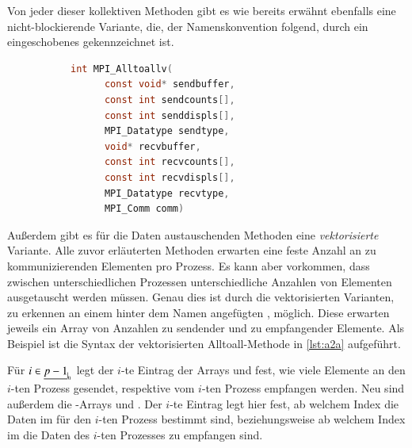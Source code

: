      Von jeder dieser kollektiven Methoden gibt es wie bereits erwähnt ebenfalls eine nicht-blockierende Variante, die, der Namenskonvention folgend, durch ein eingeschobenes 
      gekennzeichnet ist. 
      
      \begin{figure}[t]
      \begin{subfigure}{0.9\textwidth}
      \begin{lstlisting}[language=C, label=lst:a2a, caption={Die Syntax von \code{MPI\_Alltoallv}}, numbers=none]
	int MPI_Alltoallv(
	  const void* sendbuffer,
	  const int sendcounts[], 
	  const int senddispls[], 
	  MPI_Datatype sendtype, 
	  void* recvbuffer, 
	  const int recvcounts[], 
	  const int recvdispls[], 
	  MPI_Datatype recvtype, 
	  MPI_Comm comm)
      \end{lstlisting}
      \end{subfigure}
      \end{figure}
      
      Außerdem gibt es für die Daten austauschenden Methoden eine \textit{vektorisierte} Variante. Alle zuvor erläuterten Methoden erwarten eine feste Anzahl an zu 
      kommunizierenden Elementen pro Prozess.
      Es kann aber vorkommen, dass zwischen unterschiedlichen Prozessen unterschiedliche Anzahlen von Elementen ausgetauscht werden müssen. Genau dies ist durch die vektorisierten Varianten, 
      zu erkennen an einem hinter dem Namen angefügten , möglich. Diese erwarten jeweils ein Array von Anzahlen zu sendender und zu empfangender Elemente.
      Als Beispiel ist die Syntax der vektorisierten Alltoall-Methode in \autoref{lst:a2a} aufgeführt.
      
      Für $i \in \nullhaken{p-1}$ legt der $i$-te Eintrag der Arrays  und  fest, wie viele Elemente an den $i$-ten Prozess gesendet, respektive vom $i$-ten
      Prozess empfangen werden. Neu sind außerdem die -Arrays  und . Der $i$-te Eintrag legt hier fest, ab welchem Index die Daten im 
       für den $i$-ten Prozess bestimmt sind, beziehungsweise ab welchem Index im  die Daten des $i$-ten Prozesses zu empfangen sind. \citep{mpiv31}


      \clearpage
      
      